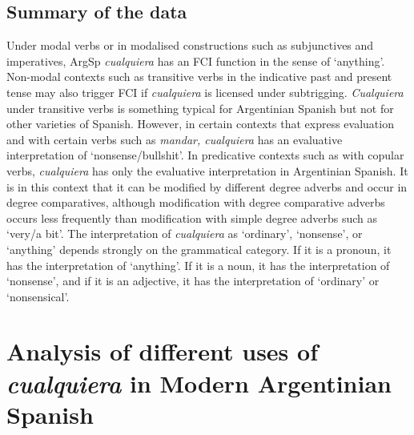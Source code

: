 \subsection{{Summary} {of} {the} {data}} \label{sec:4.3.4}

Under modal verbs or in modalised constructions such as subjunctives and imperatives, ArgSp \textit{cualquiera} has an FCI function in the sense of ‘anything’. Non-modal contexts such as transitive verbs in the indicative past and present tense may also trigger FCI if \textit{cualquiera} is licensed under subtrigging. \textit{Cualquiera} under transitive verbs is something typical for Argentinian Spanish but not for other varieties of Spanish. However, in certain contexts that express evaluation and with certain verbs such as \textit{mandar, cualquiera} has an evaluative interpretation of ‘nonsense/bullshit’. In predicative contexts such as with copular verbs, \textit{cualquiera} has only the evaluative interpretation in Argentinian Spanish. It is in this context that it can be modified by different degree adverbs and occur in degree comparatives, although modification with degree comparative adverbs occurs less frequently than modification with simple degree adverbs such as ‘very/a bit’. The interpretation of \textit{cualquiera} as ‘ordinary’, ‘nonsense’, or ‘anything’ depends strongly on the grammatical category. If it is a pronoun, it has the interpretation of ‘anything’. If it is a noun, it has the interpretation of ‘nonsense’, and if it is an adjective, it has the interpretation of ‘ordinary’ or ‘nonsensical’.


\begin{table}
\caption{\label{tab:key:11} Different interpretations in relation with verbal mood and verb type (+/– predicative verb)}
\end{table} %

\section{{Analysis} {of} {different} {uses} {of} {\textit{cualquiera}}{ }{in} {Modern} {Argentinian} {Spanish}} \label{sec:4.4}

